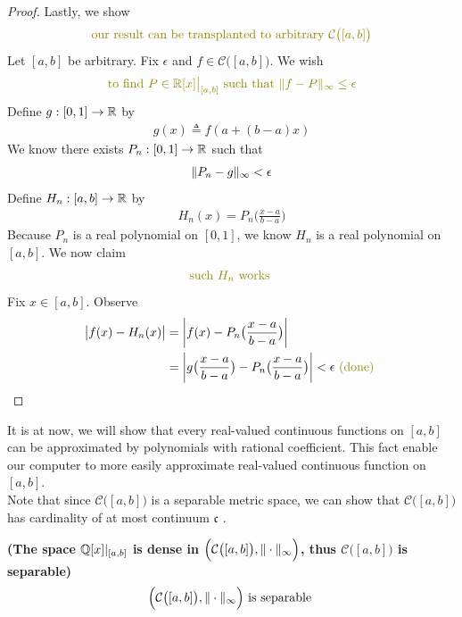 \documentclass{report}
\begin{document}
\begin{proof}
Lastly, we show 
\begin{align*}
\olive{\text{ our result can be transplanted to arbitrary $\mathcal{C}\big([a,b] \big)$ }}
\end{align*}
Let $[a,b]$ be arbitrary. Fix $\epsilon $ and $f \in \mathcal{C}\big([a,b] \big)$. We wish 
\begin{align*}
\olive{\text{ to find $P \in \R[x]\big|_{[a,b]}$ such that $\norm{f-P}_\infty\leq \epsilon $ }}
\end{align*}
Define $g:[0,1]\rightarrow \mathbb{R}$ by 
\begin{align}
g(x)\triangleq f(a+(b-a)x)
\end{align}
We know there exists $P_n:[0,1]\rightarrow \mathbb{R}$ such that 
\begin{align*}
\| P_n-g \|_{\infty}<\epsilon 
\end{align*}
Define $H_n:[a,b]\rightarrow \mathbb{R}$ by 
\begin{align*}
H_n(x)=P_n\big(\frac{x-a}{b-a} \big)
\end{align*}
Because $P_n$ is a real polynomial on  $[0,1]$, we know $H_n$ is a real polynomial on $[a,b]$. We now claim 
\begin{align*}
  \olive{\text{ such $H_n\text{ works }$ }}
\end{align*}
Fix $x \in [a,b]$. Observe 
\begin{align*}
\big|f(x)-H_n(x)\big|&=\abso{f(x)-P_n\big(\frac{x-a}{b-a} \big)}\\
&=\abso{g\big(\frac{x-a}{b-a} \big)-P_n\big(\frac{x-a}{b-a} \big)}< \epsilon \odone
\end{align*}
\end{proof}
\begin{mdframed}
It is at now, we will show that every real-valued continuous functions on $[a,b]$ can be approximated by polynomials with rational coefficient. This fact enable our computer to more easily approximate real-valued continuous function on $[a,b]$.\\

Note that since $\mathcal{C}\big([a,b] \big)$ is a separable metric space, we can show that $\mathcal{C}\big([a,b] \big)$ has cardinality of at most continuum $\mathfrak{c}$ . 
\end{mdframed}
\begin{theorem}
\textbf{(The space $\mathbb{Q}[x]|_{[a,b]}$ is dense in $\Big( \mathcal{C}\big([a,b] \big),\| \cdot \|_{\infty}\Big)$, thus $\mathcal{C}\big([a,b] \big)$ is separable)} 
\begin{align*}
\Big( \mathcal{C}\big([a,b] \big),\| \cdot \|_{\infty}\Big)\text{ is separable }
\end{align*}
\end{theorem}
\end{document}
